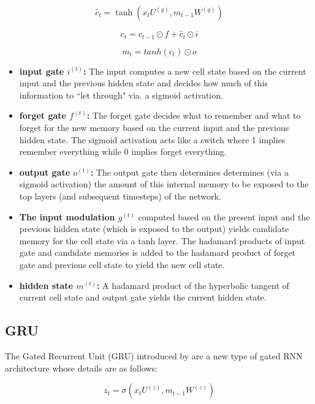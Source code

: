 \begin{equation}
\widetilde {c_t}= \tanh(x_t U^{(g)}, m_{t-1}W^{(g)})
\end{equation}

\begin{equation}
c_t = c_{t-1} \odot f + \widetilde{c_t} \odot i
\end{equation}

\begin{equation}
m_t = tanh(c_t) \odot o
\end{equation}

\begin{itemize}
	\item \textbf{input gate $i^{(t)}$:} The input computes a new cell state based on the current input and the previous hidden state and decides how much of this information to ``let through" via. a sigmoid activation.
	\item \textbf{forget gate $f^{(t)}$:} The forget gate decides what to remember and what to forget for the new memory based on the current input and the previous hidden state. The sigmoid activation acts like a switch where 1 implies remember everything while 0 implies forget everything.
	\item \textbf{output gate $o^{(t)}$:} The output gate then determines determines (via a sigmoid activation) the amount of this internal memory to be exposed to the top layers (and subsequent timesteps) of the network.
	\item \textbf{The input modulation $g^{(t)}$} computed based on the present input and the previous hidden state (which is exposed to the output) yields candidate memory for the cell state via a tanh layer. The hadamard products of input gate and candidate memories is added to the hadamard product of forget gate and previous cell state to yield the new cell state.
	\item \textbf{hidden state $m^{(t)}$:} A hadamard product of the hyperbolic tangent of current cell state and output gate yields the current hidden state.
\end{itemize}

\subsection{GRU}
The Gated Recurrent Unit (GRU) introduced by \cite{GRU} are a new type of gated RNN architecture whose details are as follows:

\begin{equation}
z_t= \sigma(x_t U^{(z)}, m_{t-1}W^{(z)})
\end{equation}

